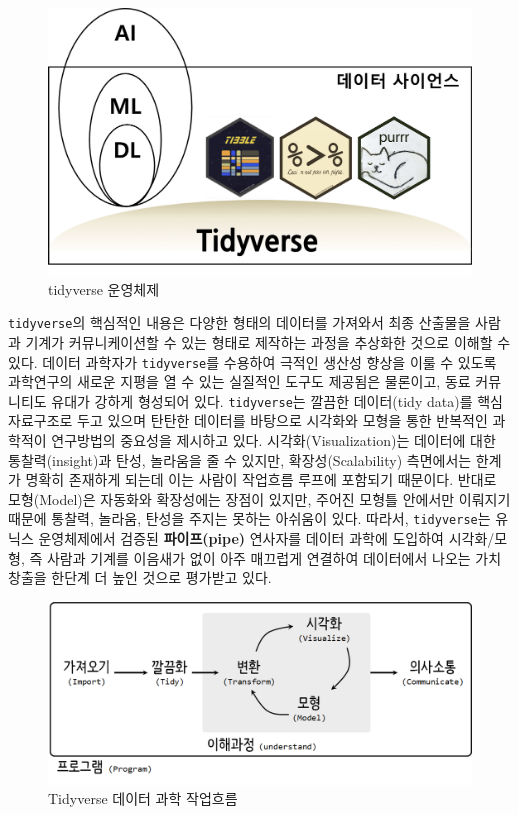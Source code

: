 \documentclass[smallextended]{svjour3}       %
\begin{document}
\begin{figure}
\hypertarget{id}{%
\centering
\includegraphics[width=1\textwidth,height=\textheight]{fig/tidyvese_os.png}
\caption{tidyverse 운영체제}\label{id}
}
\end{figure}

\texttt{tidyverse}의 핵심적인 내용\citep{wickham2019welcome}은 다양한
형태의 데이터를 가져와서 최종 산출물을 사람과 기계가 커뮤니케이션할 수
있는 형태로 제작하는 과정을 추상화한 것으로 이해할 수 있다. 데이터
과학자가 \texttt{tidyverse}를 수용하여 극적인 생산성 향상을 이룰 수
있도록 과학연구의 새로운 지평을 열 수 있는 실질적인 도구도 제공됨은
물론이고, 동료 커뮤니티도 유대가 강하게 형성되어 있다.
\texttt{tidyverse}는 깔끔한 데이터(tidy data)를 핵심 자료구조로 두고
있으며 탄탄한 데이터를 바탕으로 시각화와 모형을 통한 반복적인 과학적이
연구방법의 중요성을 제시하고 있다. 시각화(Visualization)는 데이터에 대한
통찰력(insight)과 탄성, 놀라움을 줄 수 있지만, 확장성(Scalability)
측면에서는 한계가 명확히 존재하게 되는데 이는 사람이 작업흐름 루프에
포함되기 때문이다. 반대로 모형(Model)은 자동화와 확장성에는 장점이
있지만, 주어진 모형틀 안에서만 이뤄지기 때문에 통찰력, 놀라움, 탄성을
주지는 못하는 아쉬움이 있다. 따라서, \texttt{tidyverse}는 유닉스
운영체제에서 검증된 \textbf{파이프(pipe)} 연사자를 데이터 과학에
도입하여 시각화/모형, 즉 사람과 기계를 이음새가 없이 아주 매끄럽게
연결하여 데이터에서 나오는 가치 창출을 한단계 더 높인 것으로 평가받고
있다.

\begin{figure}
\centering
\includegraphics[width=1\textwidth,height=\textheight]{fig/maso_tidyverse.png}
\caption{Tidyverse 데이터 과학 작업흐름}
\end{figure}
\end{document}
